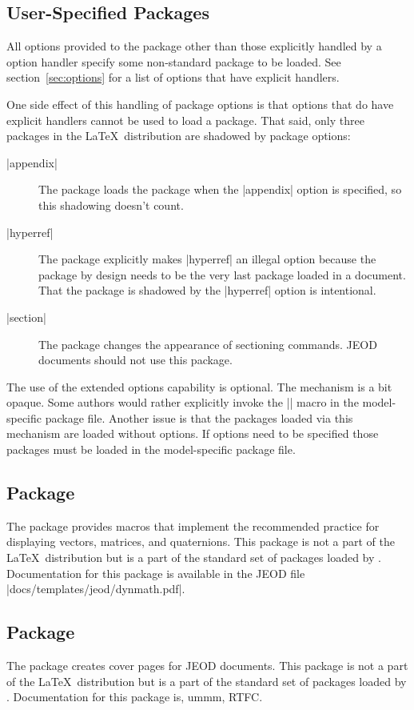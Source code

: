 \subsection{User-Specified Packages}
All options provided to the \dynenv package other than those explicitly
handled by a option handler specify some non-standard package to be
loaded. See section~\ref{sec:options} for a list of options that have
explicit handlers.

One side effect of this handling of \dynenv package options is that
options that do have explicit handlers cannot be used to load a package.
That said, only three packages in the \LaTeX\ distribution are shadowed by
\dynenv package options:
\begin{description}
\item[|appendix|] The \dynenv package loads the  package
  when the |appendix| option is specified, so this shadowing doesn't count.
\item[|hyperref|] The \dynenv package explicitly makes |hyperref| an illegal
  option because the  package by design needs to be the
  very last package loaded in a document. That the  package
  is shadowed by the |hyperref| option is intentional.
\item[|section|] The  package changes the appearance of
  sectioning commands. JEOD documents should not use this package.
\end{description}

The use of the extended options capability is optional.
The mechanism is a bit opaque. Some authors would rather explicitly
invoke the |\RequirePackage| macro in the model-specific package file.
Another issue is that the packages loaded via this mechanism are loaded without
options. If options need to be specified those packages must be loaded
in the model-specific package file.

\subsection{Package }
The  package provides macros that implement the
recommended practice for displaying vectors, matrices, and quaternions.
This package is not a part of the \LaTeX\ distribution but is a part
of the standard set of packages loaded by \dynenv.
Documentation for this package is available in the JEOD file
|docs/templates/jeod/dynmath.pdf|.

\subsection{Package }
The  package creates cover pages for JEOD documents.
This package is not a part of the \LaTeX\ distribution but is a part
of the standard set of packages loaded by \dynenv.
Documentation for this package is, ummm, RTFC.

